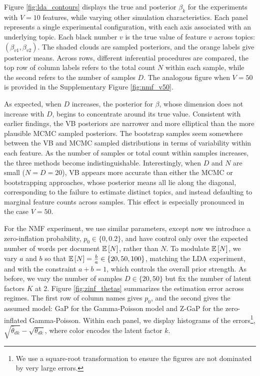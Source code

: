\documentclass[oupdraft]{bio}
\begin{document}
Figure \ref{fig:lda_contours} displays the true and posterior $\beta_{k}$ for
the experiments with $V = 10$ features, while varying other simulation characteristics.
Each panel represents a single experimental configuration, with each
axis associated with an underlying topic. Each black number $v$ is the
true value of feature $v$ across topics: $\left(\beta_{v1}, \beta_{v2}\right)$.
The shaded clouds are sampled posteriors, and the orange labels give posterior
means. Across rows, different inferential procedures are compared, the top row of
column labels refers to the total count $N$ within each sample, while the second
refers to the number of samples $D$. The analogous figure when $V = 50$ is
provided in the Supplementary Figure \ref{fig:nmf_v50}.

As expected, when $D$ increases, the posterior for $\beta$, whose dimension does
not increase with $D$, begins to concentrate around its true value. Consistent
with earlier findings, the VB posteriors are narrower and more elliptical than
the more plausible MCMC sampled posteriors. The bootstrap samples seem somewhere
between the VB and MCMC sampled distributions in terms of variability within
each feature. As the number of samples or total count within samples increases,
the three methods become indistinguishable. Interestingly, when $D$ and $N$ are
small ($N = D = 20$), VB appears more accurate than either the MCMC or
bootstrapping approaches, whose posterior means all lie along the diagonal,
corresponding to the failure to estimate distinct topics, and instead defaulting
to marginal feature counts across samples. This effect is especially pronounced
in the case $V = 50$.

For the NMF experiment, we use similar parameters, except now we introduce a
zero-inflation probability, $p_{0} \in \{0, 0.2\}$, and have control only over
the expected number of words per document $\mathbb{E}\left[{N}\right]$, rather than $N$. To
modulate $\mathbb{E}\left[{N}\right]$, we vary $a$ and $b$ so that $\mathbb{E}\left[{N}\right] = \frac{b}{a} \in
\{20, 50, 100\}$, matching the LDA experiment, and with the constraint $a + b =
1$, which controls the overall prior strength. As before, we vary the number of
samples $D \in \{20, 50\}$ but fix the number of latent factors $K$ at 2. Figure
\ref{fig:zinf_thetas} summarizes the estimation error across regimes. The first
row of column names gives $p_{0}$, and the second gives the assumed model: GaP
for the Gamma-Poisson model and Z-GaP for the zero-inflated Gamma-Poisson.
Within each panel, we display histograms of the errors\footnote{We use a
  square-root transformation to ensure the figures are not dominated by very
  large errors.}, $\sqrt{\hat{\theta}_{dk}} - \sqrt{\theta_{dk}}$, where color
encodes the latent factor $k$.
\end{document}
